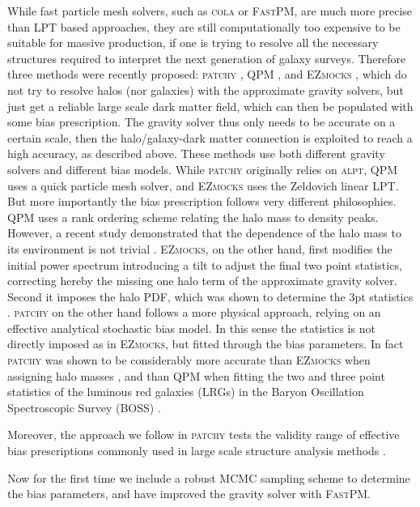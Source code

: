 While fast particle mesh solvers, such as \textsc{cola} or \textsc{FastPM}, are much more precise than LPT based approaches, they are  still computationally too expensive to be suitable for massive production, if one is trying to resolve all the necessary structures required to interpret the next generation of galaxy surveys.
Therefore three methods were recently proposed: \textsc{patchy} \citep{kitaura2014}, \textsc{QPM} \citep{qpm}, and \textsc{EZmocks} \citep{eazymock}, which do not try to resolve halos (nor galaxies) with the approximate gravity solvers, but just get a reliable large scale dark matter field, which can then be populated with some bias prescription. The gravity solver thus only needs to be accurate on a certain scale, then the halo/galaxy-dark matter connection is exploited to reach a high accuracy, as described above.
These methods use both different gravity solvers and different bias models. While \textsc{patchy} originally relies on \textsc{alpt}, \textsc{QPM} uses a quick particle mesh solver, and \textsc{EZmocks} uses the Zeldovich linear LPT.
But more importantly the bias prescription follows very different philosophies. \textsc{QPM} uses a rank ordering scheme relating the halo mass to density peaks. However, a recent study  demonstrated  that the dependence of the halo mass to its environment is not trivial \citep[see][]{zhao2015}.  \textsc{EZmocks}, on the other hand, first modifies the initial power spectrum introducing a tilt to adjust the final two point statistics, correcting hereby the missing one halo term of the approximate gravity solver. Second it imposes the halo PDF, which was shown to determine the 3pt statistics \citep{kitaura2015}.
\textsc{patchy} on the other hand follows a more physical approach, relying on an effective analytical stochastic bias model. 
In this sense the statistics is not directly imposed as in \textsc{EZmocks}, but fitted through the bias parameters. In fact \textsc{patchy} was shown to be considerably more accurate than \textsc{EZmocks} when assigning halo masses \citep{zhao2015}, and than \textsc{QPM} when fitting the two and three point statistics of the luminous red galaxies (LRGs) in the Baryon Oscillation Spectroscopic Survey (BOSS)  \citep{kitaura2016}. 

Moreover, the approach we follow in \textsc{patchy} tests the validity range of effective bias prescriptions commonly used in large scale structure analysis methods \citep[see e.g.][]{ata2015}.

Now for the first time we include a robust MCMC sampling scheme to determine the bias parameters, and have improved the gravity solver with \textsc{FastPM}.



